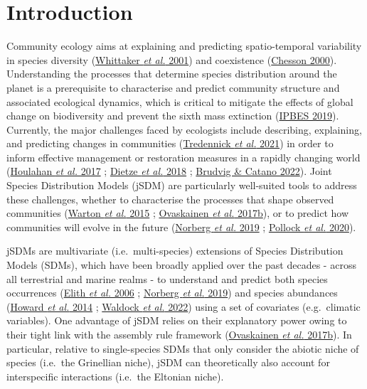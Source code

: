 \documentclass[9pt,biorxiv,doublespacing,lineno]{lapreprint}
\begin{document}
\hypertarget{introduction}{%
\section{Introduction}\label{introduction}}

Community ecology aims at explaining and predicting spatio-temporal
variability in species diversity
(\protect\hyperlink{ref-Whittaker_2001}{Whittaker \emph{et al.} 2001})
and coexistence (\protect\hyperlink{ref-Chesson_2000}{Chesson 2000}).
Understanding the processes that determine species distribution around
the planet is a prerequisite to characterise and predict community
structure and associated ecological dynamics, which is critical to
mitigate the effects of global change on biodiversity and prevent the
sixth mass extinction (\protect\hyperlink{ref-ipbes_2019}{IPBES 2019}).
Currently, the major challenges faced by ecologists include describing,
explaining, and predicting changes in communities
(\protect\hyperlink{ref-Tredennick_2021}{Tredennick \emph{et al.} 2021})
in order to inform effective management or restoration measures in a
rapidly changing world (\protect\hyperlink{ref-Houlahan_2017}{Houlahan
\emph{et al.} 2017} ; \protect\hyperlink{ref-Dietze_2018}{Dietze
\emph{et al.} 2018} ; \protect\hyperlink{ref-Brudvig_2022}{Brudvig \&
Catano 2022}). Joint Species Distribution Models (jSDM) are particularly
well-suited tools to address these challenges, whether to characterise
the processes that shape observed communities
(\protect\hyperlink{ref-Warton_2015}{Warton \emph{et al.} 2015} ;
\protect\hyperlink{ref-Ovaskainen_2017a}{Ovaskainen \emph{et al.}
2017b}), or to predict how communities will evolve in the future
(\protect\hyperlink{ref-Norberg_2019}{Norberg \emph{et al.} 2019} ;
\protect\hyperlink{ref-Pollock_2020}{Pollock \emph{et al.} 2020}).

jSDMs are multivariate (i.e.~multi-species) extensions of Species
Distribution Models (SDMs), which have been broadly applied over the
past decades - across all terrestrial and marine realms - to understand
and predict both species occurrences
(\protect\hyperlink{ref-Elith_2006}{Elith \emph{et al.} 2006} ;
\protect\hyperlink{ref-Norberg_2019}{Norberg \emph{et al.} 2019}) and
species abundances (\protect\hyperlink{ref-Howard_2014}{Howard \emph{et
al.} 2014} ; \protect\hyperlink{ref-Waldock_2022}{Waldock \emph{et al.}
2022}) using a set of covariates (e.g.~climatic variables). One
advantage of jSDM relies on their explanatory power owing to their tight
link with the assembly rule framework
(\protect\hyperlink{ref-Ovaskainen_2017a}{Ovaskainen \emph{et al.}
2017b}). In particular, relative to single-species SDMs that only
consider the abiotic niche of species (i.e.~the Grinellian niche), jSDM
can theoretically also account for interspecific interactions (i.e.~the
Eltonian niche).
\end{document}
